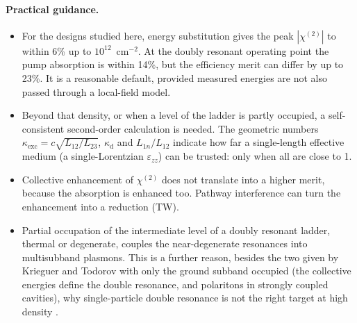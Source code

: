 \documentclass[11pt]{article}
\newcommand{\chitwo}{\chi^{(2)}}
\begin{document}
\paragraph{Practical guidance.}
\begin{itemize}
\item For the designs studied here, energy substitution gives the peak $|\chitwo|$ to within 6\% up to $10^{12}$~cm$^{-2}$. At the doubly resonant operating point the pump absorption is within 14\%, but the efficiency merit can differ by up to 23\%. It is a reasonable default, provided measured energies are not also passed through a local-field model.
\item Beyond that density, or when a level of the ladder is partly occupied, a self-consistent second-order calculation is needed. The geometric numbers $\kappa_\mathrm{exc}=c\sqrt{L_{12}/L_{23}}$, $\kappa_\mathrm{d}$ and $L_{1n}/L_{12}$ indicate how far a single-length effective medium (a single-Lorentzian $\varepsilon_{zz}$) can be trusted: only when all are close to 1.
\item Collective enhancement of $\chitwo$ does not translate into a higher merit, because the absorption is enhanced too. Pathway interference can turn the enhancement into a reduction (TW).
\item Partial occupation of the intermediate level of a doubly resonant ladder, thermal or degenerate, couples the near-degenerate resonances into multisubband plasmons. This is a further reason, besides the two given by Krieguer and Todorov with only the ground subband occupied (the collective energies define the double resonance, and polaritons in strongly coupled cavities), why single-particle double resonance is not the right target at high density \cite{Krieguer2024}.
\end{itemize}
\end{document}
